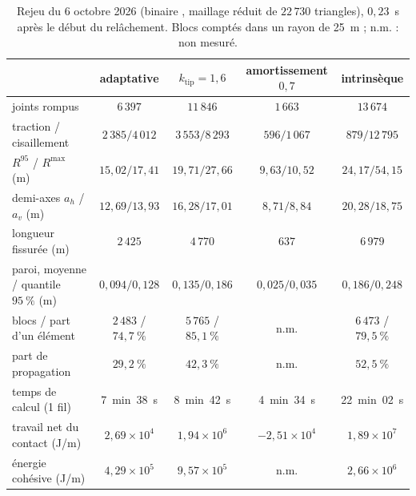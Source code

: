 \begin{table}[htbp]
\centering
\caption{Rejeu du 6 octobre 2026 (binaire , maillage réduit de $22\,730$ triangles), $0{,}23$~s après le début du relâchement. Blocs comptés dans un rayon de 25~m ; n.m. : non mesuré.}
\label{tab-tun-rejeu}
\footnotesize
\setlength{\tabcolsep}{4pt}
\begin{tabular}{@{}lcccc@{}}
\toprule
 & adaptative & $k_\text{tip} = 1{,}6$ & amortissement $0{,}7$ & intrinsèque \\
\midrule
joints rompus & $6\,397$ & $11\,846$ & $1\,663$ & $13\,674$ \\
traction / cisaillement & $2\,385 / 4\,012$ & $3\,553 / 8\,293$ & $596 / 1\,067$ & $879 / 12\,795$ \\
$R^{95}$ / $R^\text{max}$ (m) & $15{,}02 / 17{,}41$ & $19{,}71 / 27{,}66$ & $9{,}63 / 10{,}52$ & $24{,}17 / 54{,}15$ \\
demi-axes $a_h$ / $a_v$ (m) & $12{,}69 / 13{,}93$ & $16{,}28 / 17{,}01$ & $8{,}71 / 8{,}84$ & $20{,}28 / 18{,}75$ \\
longueur fissurée (m) & $2\,425$ & $4\,770$ & $637$ & $6\,979$ \\
paroi, moyenne / quantile $95~\%$ (m) & $0{,}094 / 0{,}128$ & $0{,}135 / 0{,}186$ & $0{,}025 / 0{,}035$ & $0{,}186 / 0{,}248$ \\
blocs / part d'un élément & $2\,483$ / $74{,}7~\%$ & $5\,765$ / $85{,}1~\%$ & n.m. & $6\,473$ / $79{,}5~\%$ \\
part de propagation & $29{,}2~\%$ & $42{,}3~\%$ & n.m. & $52{,}5~\%$ \\
temps de calcul (1 fil) & 7~min~38~s & 8~min~42~s & 4~min~34~s & 22~min~02~s \\
\midrule
travail net du contact (J/m) & $2{,}69\times10^4$ & $1{,}94\times10^6$ & $-2{,}51\times10^4$ & $1{,}89\times10^7$ \\
énergie cohésive (J/m) & $4{,}29\times10^5$ & $9{,}57\times10^5$ & n.m. & $2{,}66\times10^6$ \\
\bottomrule
\end{tabular}
\end{table}

